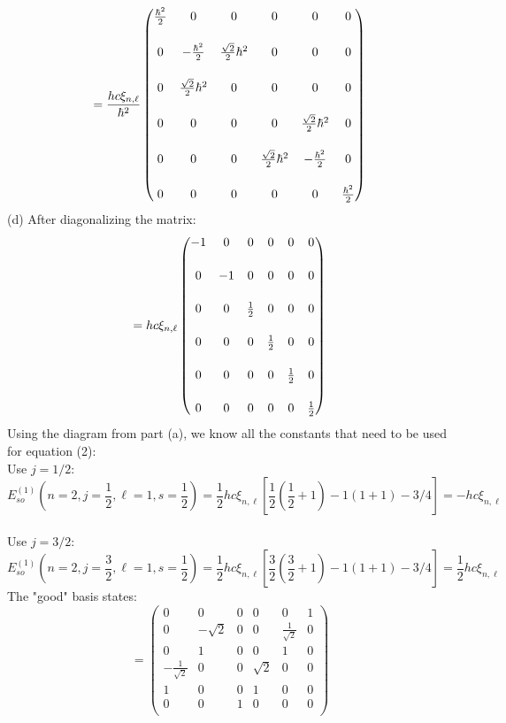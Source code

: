 \documentclass[11pt]{article}
\def\h{\hbar}
\def\l{\ell}
\def\sp{\vspace{3mm}}
\newcommand{\Matrix}[1]{\begin{pmatrix} #1 \end{pmatrix}}
\theoremstyle{pink}
\theoremstyle{boxedsolution}
\theoremstyle{definition}
\theoremstyle{claim}
\begin{document}
\[=\frac{hc\xi_{n,\l}}{\h^2}
\Matrix{
\frac{\h^2}{2} & 0 & 0 & 0 & 0 & 0\\
\vspace{1mm}
\\0 & -\frac{\h^2}{2} & \frac{\sqrt{2}}{2}\h^2 & 0 & 0 & 0\\
\vspace{1mm}
\\0 & \frac{\sqrt{2}}{2}\h^2 & 0 & 0 & 0 & 0\\
\vspace{1mm}
\\0 & 0 & 0 & 0 & \frac{\sqrt{2}}{2}\h^2 & 0\\
\vspace{1mm}
\\0 & 0 & 0 & \frac{\sqrt{2}}{2}\h^2 & -\frac{\h^2}{2} & 0\\
\vspace{1mm}
\\0 & 0 & 0 & 0 & 0 & \frac{\h^2}{2}}\]
(d) After diagonalizing the matrix:
\[=hc\xi_{n,\l}
\Matrix{
-1 & 0 & 0 & 0 & 0 & 0\\
\vspace{1mm}
\\0 & -1 & 0 & 0 & 0 & 0\\
\vspace{1mm}
\\0 & 0 & \frac{1}{2} & 0 & 0 & 0\\
\vspace{1mm}
\\0 & 0 & 0 & \frac{1}{2} & 0 & 0\\
\vspace{1mm}
\\0 & 0 & 0 & 0 & \frac{1}{2} & 0\\
\vspace{1mm}
\\0 & 0 & 0 & 0 & 0 & \frac{1}{2}}\]
Using the diagram from part (a), we know all the constants that need to be used for equation (2):\\
Use $j=1/2$:
\sp
\[E^{(1)}_{so}\left(n=2,j=\frac{1}{2}, \l=1, s=\frac{1}{2}\right)=\frac{1}{2}hc\xi_{n,\l}\left[\frac{1}{2}\left(\frac{1}{2}+1\right)-1(1+1)-3/4\right]=-hc\xi_{n,\l}\]
\sp
\\Use $j=3/2$:
\[E^{(1)}_{so}\left(n=2,j=\frac{3}{2}, \l=1, s=\frac{1}{2}\right)=\frac{1}{2}hc\xi_{n,\l}\left[\frac{3}{2}\left(\frac{3}{2}+1\right)-1(1+1)-3/4\right]=\frac{1}{2}hc\xi_{n,\l}\]
The "good" basis states:
\[=\Matrix{
0 & 0 & 0 & 0 & 0 & 1\\
0 & -\sqrt{2} & 0 & 0 & \frac{1}{\sqrt{2}} & 0\\
0 & 1 & 0 & 0 & 1 & 0\\
-\frac{1}{\sqrt{2}} & 0 & 0 & \sqrt{2} & 0 & 0\\
1 & 0 & 0 & 1 & 0 & 0\\
0 & 0 & 1 & 0 & 0 & 0\\
}\]
\end{document}
